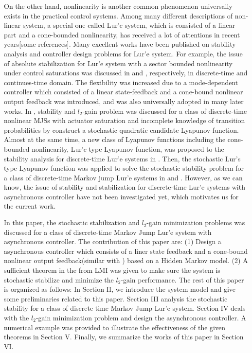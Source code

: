 \documentclass[conference]{IEEEtran}
\begin{document}
	On the other hand, nonlinearity is another common phenomenon universally exists in the practical control systems. Among many different descriptions of non-linear system, a special one called Lur'e system\cite{khnlil}, which is consisted of a linear part and a cone-bounded nonlinearity, has received a lot of attentions in recent years[some references]. Many excellent works have been published on stability analysis and controller design problems for Lur'e system. For example, the issue of absolute stabilization for Lur'e system with a sector bounded nonlinearity under control saturations was discussed in \cite{state_output_control_EB} and \cite{state_output_control_EB_continues}, respectively, in discrete-time and continues-time domain. The flexibility was increased due to a mode-dependent controller which consisted of a linear state-feedback and a cone-bound nonlinear output feedback was introduced, and was also universally adopted in many later works. In \cite{song_control}, stability and $l_2$-gain problem was discussed for a class of discrete-time nonlinear MJSs with actuator saturation and incomplete knowledge of transition probabilities by construct a stochastic quadratic candidate Lyapunov function. Almost at the same time, a new class of Lyapunov functions including the cone-bounded nonlinearity, Lur'e type Lyapunov function, was proposed to the stability analysis for discrete-time Lur'e systems in \cite{gonzaga}. Then, the stochastic Lur's type Lyapunov function was applied to solve the stochastic stability problem for a class of discrete-time Markov jump Lur'e systems in \cite{costaolv_control_1} and \cite{costaolv_control}. However, as we can know, the issue of stability and stabilization for discrete-time Lur'e systems with asynchronous controller have not been investigated yet, which motivates us for the current work. 
	
	In this paper, the stochastic stabilization and $l_2$-gain minimization problems was discussed for a class of discrete-time Markov Jump Lur'e system with asynchronous controller. The contribution of this paper are: (1) Design a asynchronous controller which consists of a liner state feedback and a cone-bound nonlinear output feedback(similar with \cite{gonzaga}) based on a Hidden Markov model. (2) A sufficient theorem in the from LMI was given to make sure the system is stochastic stabilize and minimize the $l_2$-gain performance. The rest of this paper is organized as follows: In Section II, we introduce the system model and give some preliminaries related to this paper.  Section III analysis the stochastic stability for a class of discrete-time Markov Jump Lur'e system.  Section IV deals with the $l_2$-gain minimization problem and design the asynchronous controller. A numerical example was provided to illustrate the effectiveness of the given theorems in Section V. Finally, we summarize the works of this paper in Section VI. 
	
\end{document}
